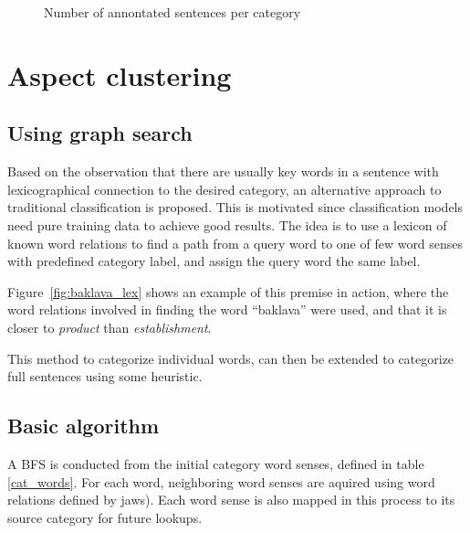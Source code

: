 \documentclass[a4paper,11pt]{kth-mag}
\begin{document}
\begin{figure}[t]
  \centering
  \caption{Number of annontated sentences per category}
  \label{fig:cat_count}
\end{figure}


\newpage

\section{Aspect clustering}
\subsection{Using graph search}
Based on the observation that there are usually key words in a sentence with lexicographical connection to the desired category, an alternative approach to traditional classification is proposed. This is motivated since classification models need pure training data to achieve good results. The idea is to use a lexicon of known word relations to find a path from a query word to one of few word senses with predefined category label, and assign the query word the same label.

Figure~\ref{fig:baklava_lex} shows an example of this premise in action, where the word relations involved in finding the word ``baklava'' were used, and that it is closer to \emph{product} than \emph{establishment}.

This method to categorize individual words, can then be extended to categorize full sentences using some heuristic.


\subsection{Basic algorithm}
A \gls{BFS} is conducted from the initial category word senses, defined in table \ref{cat_words}. For each word, neighboring word senses are aquired using word relations defined by \gls{jaws}). Each word sense is also mapped in this process to its source category for future lookups.
\end{document}
